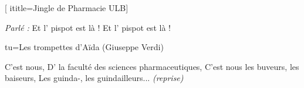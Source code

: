  [
ititle={Jingle de Pharmacie ULB}]

\beginverse
\textit{Parlé :}
{Et l' pispot est là !}
Et l' pispot est là !
\endverse

tu={Les trompettes d'Aïda (Giuseppe Verdi)}

\beginverse
C'est nous,
D' la faculté des sciences pharmaceutiques,
C'est nous les buveurs, les baiseurs,
Les guinda-, les guindailleurs... \textit{(reprise)}
\endverse
\endsong